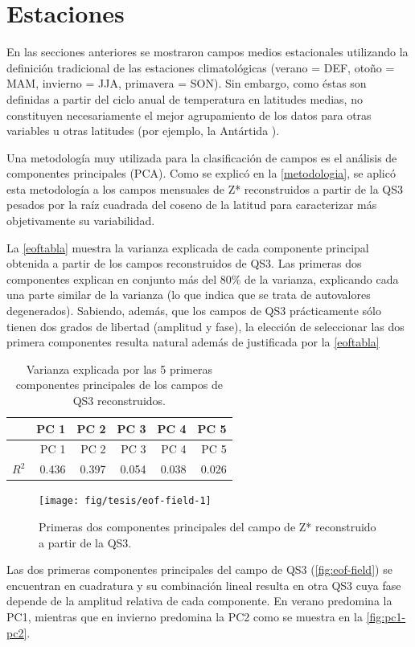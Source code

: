 \documentclass[spanish,a4paper,12pt,oneside]{book}
\begin{document}
\section{Estaciones}\label{estaciones}

En las secciones anteriores se mostraron campos medios estacionales
utilizando la definición tradicional de las estaciones climatológicas
(verano = DEF, otoño = MAM, invierno = JJA, primavera = SON). Sin
embargo, como éstas son definidas a partir del ciclo anual de
temperatura en latitudes medias, no constituyen necesariamente el mejor
agrupamiento de los datos para otras variables u otras latitudes (por
ejemplo, la Antártida \citep{King1997}).

Una metodología muy utilizada para la clasificación de campos es el
análisis de componentes principales (PCA). Como se explicó en la
\autoref{metodologia}, se aplicó esta metodología a los campos mensuales
de Z* reconstruidos a partir de la QS3 pesados por la raíz cuadrada del
coseno de la latitud para caracterizar más objetivamente su
variabilidad.

La \autoref{eoftabla} muestra la varianza explicada de cada componente
principal obtenida a partir de los campos reconstruidos de QS3. Las
primeras dos componentes explican en conjunto más del 80\% de la
varianza, explicando cada una parte similar de la varianza (lo que
indica que se trata de autovalores degenerados). Sabiendo, además, que
los campos de QS3 prácticamente sólo tienen dos grados de libertad
(amplitud y fase), la elección de seleccionar las dos primera
componentes resulta natural además de justificada por la
\autoref{eoftabla}

\begin{longtable}[]{@{}lrrrrr@{}}
\caption{Varianza explicada por las 5 primeras componentes principales
de los campos de QS3 reconstruidos.\label{eoftabla}}\tabularnewline
\toprule
& PC 1 & PC 2 & PC 3 & PC 4 & PC 5\tabularnewline
\midrule
\endfirsthead
\toprule
& PC 1 & PC 2 & PC 3 & PC 4 & PC 5\tabularnewline
\midrule
\endhead
\(R^2\) & 0.436 & 0.397 & 0.054 & 0.038 & 0.026\tabularnewline
\bottomrule
\end{longtable}

\begin{figure}
\texttt{[image: fig/tesis/eof-field-1]} \caption{Primeras dos componentes principales del campo de Z* reconstruido a partir de la QS3.}\label{fig:eof-field}
\end{figure}

Las dos primeras componentes principales del campo de QS3
(\autoref{fig:eof-field}) se encuentran en cuadratura y su combinación
lineal resulta en otra QS3 cuya fase depende de la amplitud relativa de
cada componente. En verano predomina la PC1, mientras que en invierno
predomina la PC2 como se muestra en la \autoref{fig:pc1-pc2}.
\end{document}
